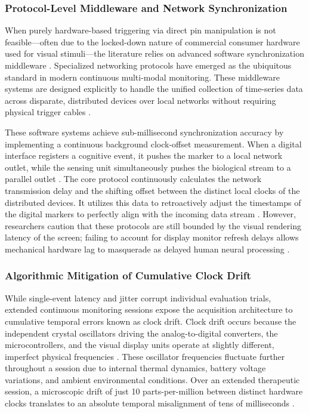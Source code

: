 \subsubsection{Protocol-Level Middleware and Network Synchronization}

When purely hardware-based triggering via direct pin manipulation is not feasible—often due to the locked-down nature of commercial consumer hardware used for visual stimuli—the literature relies on advanced software synchronization middleware \cite{lorenz2024review}. Specialized networking protocols have emerged as the ubiquitous standard in modern continuous multi-modal monitoring. These middleware systems are designed explicitly to handle the unified collection of time-series data across disparate, distributed devices over local networks without requiring physical trigger cables \cite{daza2025multimodal}.

These software systems achieve sub-millisecond synchronization accuracy by implementing a continuous background clock-offset measurement. When a digital interface registers a cognitive event, it pushes the marker to a local network outlet, while the sensing unit simultaneously pushes the biological stream to a parallel outlet \cite{klumpp2025syntalos}. The core protocol continuously calculates the network transmission delay and the shifting offset between the distinct local clocks of the distributed devices. It utilizes this data to retroactively adjust the timestamps of the digital markers to perfectly align with the incoming data stream \cite{dasenbrock2022synchronization}. However, researchers caution that these protocols are still bounded by the visual rendering latency of the screen; failing to account for display monitor refresh delays allows mechanical hardware lag to masquerade as delayed human neural processing \cite{han2022assessing}.

\subsubsection{Algorithmic Mitigation of Cumulative Clock Drift}

While single-event latency and jitter corrupt individual evaluation trials, extended continuous monitoring sessions expose the acquisition architecture to cumulative temporal errors known as clock drift. Clock drift occurs because the independent crystal oscillators driving the analog-to-digital converters, the microcontrollers, and the visual display units operate at slightly different, imperfect physical frequencies \cite{ionescu2022synchronization}.  These oscillator frequencies fluctuate further throughout a session due to internal thermal dynamics, battery voltage variations, and ambient environmental conditions. Over an extended therapeutic session, a microscopic drift of just 10 parts-per-million between distinct hardware clocks translates to an absolute temporal misalignment of tens of milliseconds \cite{ding2025wireless}.

